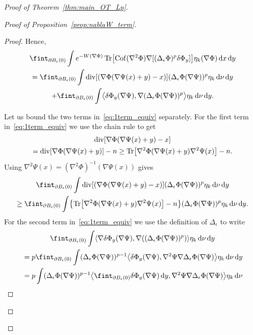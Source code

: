 \documentclass[AHL,Unicode,longabstracts]{cedram}
\DeclareMathOperator{\Tr}{Tr}
\DeclareMathOperator{\Cof}{Cof}
\DeclareMathOperator{\Div}{div}
\newcommand{\W}{W}
\newcommand{\dd}{n}
\newcommand{\target}{\nu}
\newcommand*\diff{\mathop{}\!\mathrm{d}}
\newcommand{\OT}{\Phi}
\newcommand{\avgint}{\fint}
\newcommand{\findiff}{\delta\OT}
\let\originalleft\left
\let\originalright\right
\renewcommand{\left}{\mathopen{}\mathclose\bgroup\originalleft}
\renewcommand{\right}{\aftergroup\egroup\originalright}
\begin{document}
\begin{proof}[Proof of Theorem~\ref{thm:main_OT_Lp}]
\begin{proof}[Proof of Proposition~\ref{prop:nablaW_term}]
\begin{proof}
Hence,
\begin{multline}\label{eq:1term_equiv}
\avgint_{\partial B_{\epsilon}(0)}\int e^{-\W(\nabla\OT)} \Tr\left[\Cof(\nabla^2\OT)\nabla[(\Delta_{\epsilon}\OT)^p\findiff_y]\right]\eta_k(\nabla\OT)\diff x\diff y\\
=\avgint_{\partial B_{\epsilon}(0)}\int \Div[\left(\nabla \OT(\nabla\Psi(x)+y)-x\right)](\Delta_{\epsilon}\OT(\nabla\Psi))^p \eta_k\diff \target\diff y\\
+\avgint_{\partial B_{\epsilon}(0)}\int \bigl\langle\findiff_y(\nabla\Psi),\nabla(\Delta_{\epsilon}\OT(\nabla\Psi))^p \bigr\rangle\eta_k\diff \target\diff y.
\end{multline}

Let us bound the two terms in~\eqref{eq:1term_equiv} separately. For the first term in~\eqref{eq:1term_equiv} we use the chain rule to get
\begin{multline*}
\Div[\nabla \OT(\nabla\Psi(x)+y)-x]\\
=\Div[\nabla \OT(\nabla\Psi(x)+y)]-\dd\ge \Tr\left[\nabla^2\OT(\nabla\Psi(x)+y)\nabla^2\Psi(x)\right]-\dd.
\end{multline*}
Using $\nabla^2\Psi(x)=(\nabla^2\OT)^{-1}(\nabla\Psi(x))$ gives
\begin{multline}\label{eq:1term_1}
\avgint_{\partial B_{\epsilon}(0)}\int \Div[\left(\nabla \OT(\nabla\Psi(x)+y)-x\right)](\Delta_{\epsilon}\OT(\nabla\Psi))^p \eta_k\diff \target\diff y\\
\ge \avgint_{\partial B_{\epsilon}(0)}\int\left \{\Tr\left[\nabla^2\OT(\nabla\Psi(x)+y)\nabla^2\Psi(x)\right]-\dd\right\}(\Delta_{\epsilon}\OT(\nabla\Psi))^p \eta_k\diff \target\diff y.
\end{multline}
For the second term in~\eqref{eq:1term_equiv} we use the definition of $\Delta_{\epsilon}$ to write
\begin{multline}\label{eq:1term_2}
\avgint_{\partial B_{\epsilon}(0)}\int \left\langle\nabla \findiff_y(\nabla\Psi), \nabla\left((\Delta_{\epsilon}\OT(\nabla \Psi))^p\right) \right\rangle \eta_k\diff \target\diff y
\\ 
\begin{aligned}
&=p\avgint_{\partial B_{\epsilon}(0)}\int (\Delta_{\epsilon}\OT(\nabla \Psi))^{p-1} \left\langle \findiff_y(\nabla\Psi), \nabla^2\Psi \nabla\Delta_{\epsilon}\OT(\nabla \Psi)\right\rangle \eta_k\diff \target\diff y\\
&=p\int (\Delta_{\epsilon}\OT(\nabla \Psi))^{p-1} \left\langle \avgint_{\partial B_{\epsilon}(0)}\findiff_y(\nabla\Psi)\diff y,\nabla^2\Psi \nabla\Delta_{\epsilon}\OT(\nabla \Psi)\right\rangle \eta_k\diff \target \\

\end{aligned}
\end{multline}
\end{proof}
\end{proof}
\end{proof}
\end{document}
